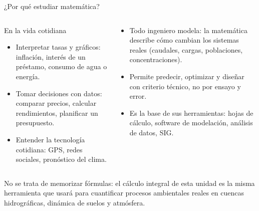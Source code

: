 \documentclass[aspectratio=169,11pt]{beamer}
\begin{document}
\begin{frame}{¿Por qué estudiar matemática?}
\small
\begin{columns}[T,onlytextwidth]
\begin{block}{En la vida cotidiana}
\footnotesize
\begin{itemize}[itemsep=0pt,topsep=1pt]
  \item Interpretar tasas y gráficos: inflación, interés de un préstamo, consumo de agua o energía.
  \item Tomar decisiones con datos: comparar precios, calcular rendimientos, planificar un presupuesto.
  \item Entender la tecnología cotidiana: GPS, redes sociales, pronóstico del clima.
\end{itemize}
\end{block}
\begin{envbox}[title=En la vida profesional]
\footnotesize
\begin{itemize}[itemsep=0pt,topsep=1pt]
  \item Todo ingeniero modela: la matemática describe cómo cambian los sistemas reales (caudales, cargas, poblaciones, concentraciones).
  \item Permite predecir, optimizar y diseñar con criterio técnico, no por ensayo y error.
  \item Es la base de sus herramientas: hojas de cálculo, software de modelación, análisis de datos, SIG.
\end{itemize}
\end{envbox}
\end{columns}
\vspace{0.06cm}
\begin{keybox}[top=2pt,bottom=2pt]
\footnotesize No se trata de memorizar fórmulas: el cálculo integral de esta unidad es la misma herramienta que usará para cuantificar procesos ambientales reales en cuencas hidrográficas, dinámica de suelos y atmósfera.
\end{keybox}
\end{frame}
\end{document}
